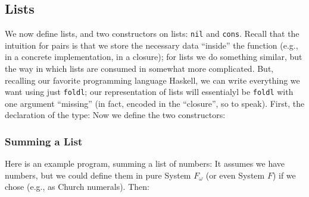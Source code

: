 \documentclass[10pt]{article}
\begin{document}
\subsection{Lists}

We now define lists, and two constructors on lists: \texttt{nil} and \texttt{cons}.
Recall that the intuition for pairs is that we store the necessary data ``inside'' the function (e.g., in a concrete implementation, in a closure); for lists we do something similar, but the way in which lists are consumed in somewhat more complicated.
But, recalling our favorite programming language Haskell, we can write everything we want using just \texttt{foldl}; our representation of lists will essentialyl be \texttt{foldl} with one argument ``missing'' (in fact, encoded in the ``closure'', so to speak).
First, the declaration of the type:
Now we define the two constructors:

\subsubsection{Summing a List}
Here is an example program, summing a list of numbers:
It assumes we have numbers, but we could define them in pure System $F_\omega$ (or even System $F$) if we chose (e.g., as Church numerals).
Then:
\end{document}
